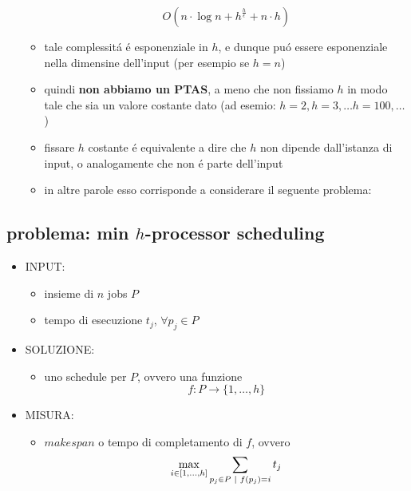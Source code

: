 \begin{flushleft}
\begin{itemize}
\begin{itemize}
				$$O(n\cdot\log n+h^\frac{h}{\epsilon}+n\cdot h)$$
			\item tale complessit\'a \'e esponenziale in $h$, e dunque pu\'o essere esponenziale nella dimensine dell'input (per esempio se $h=n$)
			\item quindi \textbf{non abbiamo un PTAS}, a meno che non fissiamo $h$ in modo tale che sia un valore costante dato (ad esemio: $h=2,h=3,\ldots h=100,\ldots$)
			\item fissare $h$ costante \'e equivalente a dire che $h$ non dipende dall'istanza di input, o analogamente che non \'e parte dell'input
			\item in altre parole esso corrisponde a considerare il seguente problema:
		\end{itemize}
	\end{itemize}
\end{flushleft}


\subsection*{problema: min $h$-processor scheduling}
\begin{flushleft}
	\begin{itemize}
		\item INPUT:
		\begin{itemize}
			\item insieme di $n$ jobs $P$
			\item tempo di esecuzione $t_j$, $\forall p_j\in P$
		\end{itemize}
		\item SOLUZIONE:
		\begin{itemize}
			\item uno schedule per $P$, ovvero una funzione
				$$f:P\rightarrow\{1,\ldots,h\}$$
		\end{itemize}
		\item MISURA:
		\begin{itemize}
			\item $makespan$ o tempo di completamento di $f$, ovvero
				$$\max_{i\in[1,\ldots,h]}\sum_{p_j\in P\hspace{0.1cm}\vert\hspace{0.1cm}f(p_j)=i}t_j$$
		\end{itemize}
	\end{itemize}
\end{flushleft}

